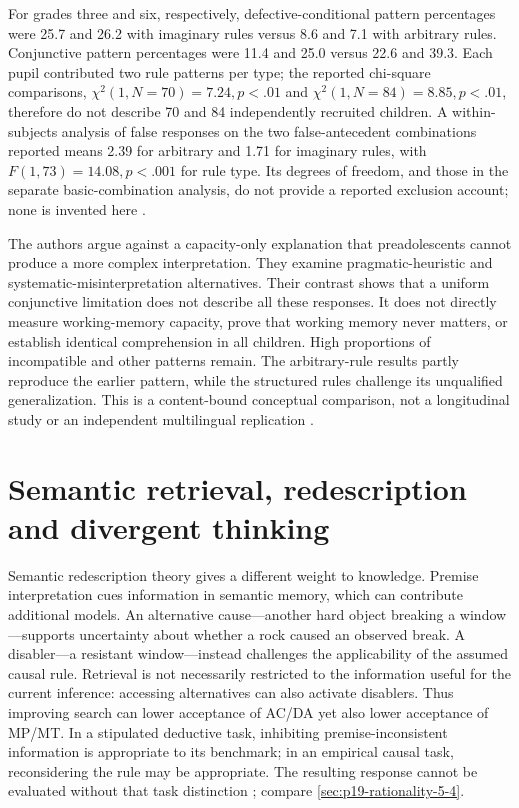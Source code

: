 For grades three and six, respectively, defective-conditional pattern
percentages were 25.7 and 26.2 with imaginary rules versus 8.6 and 7.1 with
arbitrary rules. Conjunctive pattern percentages were 11.4 and 25.0 versus
22.6 and 39.3. Each pupil contributed two rule patterns per type; the reported
chi-square comparisons, \(\chi^2(1,N=70)=7.24,p<.01\) and
\(\chi^2(1,N=84)=8.85,p<.01\), therefore do not describe 70 and 84
independently recruited children. A within-subjects analysis of false responses
on the two false-antecedent combinations reported means 2.39 for arbitrary
and 1.71 for imaginary rules, with \(F(1,73)=14.08,p<.001\) for rule
type. Its degrees of freedom, and those in the separate basic-combination
analysis, do not provide a reported exclusion account; none is invented here
\cite[pp.~1910--1911, tables~1--2]{MarkovitsBrissonDeChantal2016Conditionals}.

The authors argue against a capacity-only explanation that preadolescents
cannot produce a more complex interpretation. They examine pragmatic-heuristic
and systematic-misinterpretation alternatives. Their contrast shows that a
uniform conjunctive limitation does not describe all these responses. It does
not directly measure working-memory capacity, prove that working memory never
matters, or establish identical comprehension in all children. High proportions
of incompatible and other patterns remain. The arbitrary-rule results partly
reproduce the earlier pattern, while the structured rules challenge its
unqualified generalization. This is a content-bound conceptual comparison,
not a longitudinal study or an independent multilingual replication
\cite[pp.~1911--1912]{MarkovitsBrissonDeChantal2016Conditionals}.

\section{Semantic retrieval, redescription and divergent thinking}
\label{sec:p19-r151-semantic}

Semantic redescription theory gives a different weight to knowledge. Premise
interpretation cues information in semantic memory, which can contribute
additional models. An alternative cause---another hard object breaking a
window---supports uncertainty about whether a rock caused an observed break.
A disabler---a resistant window---instead challenges the applicability of
the assumed causal rule. Retrieval is not necessarily restricted to the
information useful for the current inference: accessing alternatives can also
activate disablers. Thus improving search can lower acceptance of AC/DA yet
also lower acceptance of MP/MT. In a stipulated deductive task, inhibiting
premise-inconsistent information is appropriate to its benchmark; in an
empirical causal task, reconsidering the rule may be appropriate. The resulting
response cannot be evaluated without that task distinction
\cite[pp.~785--786]{Markovits2021DevelopmentRationality}; compare
\cref{sec:p19-rationality-5-4}.

